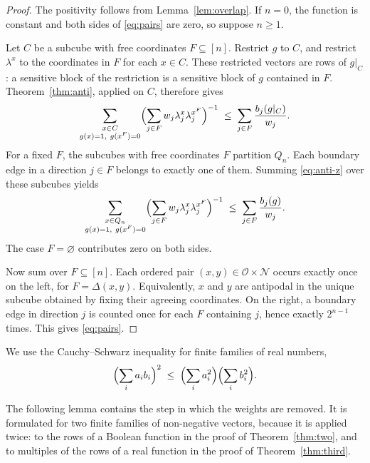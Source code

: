 \documentclass[11pt,reqno]{amsart}
\makeatletter
\theoremstyle{definition}
\theoremstyle{remark}
\numberwithin{equation}{section}
\theoremstyle{named}
\theoremstyle{plain}
\renewcommand{\subsection}{\@startsection{subsection}{2}%
  \z@{1.0\linespacing\@plus.4\linespacing\@minus.15\linespacing}{-.5em}{\normalfont\bfseries}}
\newcommand{\cO}{\mathcal{O}}
\newcommand{\cN}{\mathcal{N}}
\makeatother
\begin{document}
\begin{proof}
The positivity follows from Lemma~\ref{lem:overlap}. If $n=0$, the function is constant and
both sides of \eqref{eq:pairs} are zero, so suppose $n\ge1$.

Let $C$ be a subcube with free coordinates $F\subseteq[n]$. Restrict $g$ to $C$, and restrict
$\lambda^x$ to the coordinates in $F$ for each $x\in C$. These restricted vectors are rows of
$g|_C$: a sensitive block of the restriction is a sensitive block of $g$ contained in $F$.
Theorem~\ref{thm:anti}, applied on $C$, therefore gives
\begin{equation}\label{eq:anti-z}
   \sum_{\substack{x\in C\\g(x)=1,\ g(x^F)=0}}
   \Bigl(\sum_{j\in F}w_j\lambda^x_j\lambda^{x^F}_j\Bigr)^{-1}
   \;\le\;\sum_{j\in F}\frac{b_j(g|_C)}{w_j}.
\end{equation}
For a fixed $F$, the subcubes with free coordinates $F$ partition $Q_n$. Each boundary edge
in a direction $j\in F$ belongs to exactly one of them. Summing \eqref{eq:anti-z} over these
subcubes yields
\begin{equation}\label{eq:pairsF}
   \sum_{\substack{x\in Q_n\\g(x)=1,\ g(x^F)=0}}
   \Bigl(\sum_{j\in F}w_j\lambda^x_j\lambda^{x^F}_j\Bigr)^{-1}
   \;\le\;\sum_{j\in F}\frac{b_j(g)}{w_j}.
\end{equation}
The case $F=\varnothing$ contributes zero on both sides.

Now sum over $F\subseteq[n]$. Each ordered pair $(x,y)\in\cO\times\cN$ occurs exactly once
on the left, for $F=\Delta(x,y)$. Equivalently, $x$ and $y$ are antipodal in the unique subcube
obtained by fixing their agreeing coordinates. On the right, a boundary edge in direction $j$
is counted once for each $F$ containing $j$, hence exactly $2^{n-1}$ times. This gives
\eqref{eq:pairs}.
\end{proof}

\subsection{Removing the weights}

We use the Cauchy--Schwarz inequality for finite families of real numbers,
\[
   \Bigl(\sum_{i}a_ib_i\Bigr)^{2}\;\le\;\Bigl(\sum_ia_i^{2}\Bigr)\Bigl(\sum_ib_i^{2}\Bigr).
\]

The following lemma contains the step in which the weights are removed. It is formulated for two
finite families of non-negative vectors, because it is applied twice: to the rows of a Boolean
function in the proof of Theorem~\ref{thm:two}, and to multiples of the rows of a real function in
the proof of Theorem~\ref{thm:third}.
\end{document}
